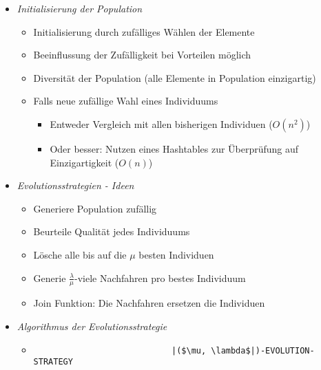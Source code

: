 \begin{itemize}
\begin{itemize}
                \item \textit{Initialisierung der Population}
                    \begin{itemize}
                        \item Initialisierung durch zufälliges Wählen der Elemente
                        \item Beeinflussung der Zufälligkeit bei Vorteilen möglich
                        \item Diversität der Population (alle Elemente in Population einzigartig)
                        \item Falls neue zufällige Wahl eines Individuums
                            \begin{itemize}
                                \item Entweder Vergleich mit allen bisherigen Individuen ($O(n^2)$)
                                \item Oder besser: Nutzen eines Hashtables zur Überprüfung auf Einzigartigkeit ($O(n)$)
                            \end{itemize}
                    \end{itemize}

                \item \textit{Evolutionsstrategien - Ideen}
                    \begin{itemize}
                        \item Generiere Population zufällig
                        \item Beurteile Qualität jedes Individuums
                        \item Lösche alle bis auf die $\mu$ besten Individuen
                        \item Generie $\frac{\lambda}{\mu}$-viele Nachfahren pro bestes Individuum
                        \item Join Funktion: Die Nachfahren ersetzen die Individuen
                    \end{itemize}
                
                \item \textit{Algorithmus der Evolutionsstrategie}
                    \begin{itemize}
                        \item[]
                            \begin{verbatim}
                            |($\mu, \lambda$|)-EVOLUTION-STRATEGY


\end{verbatim}
\end{itemize}
\end{itemize}
\end{itemize}
